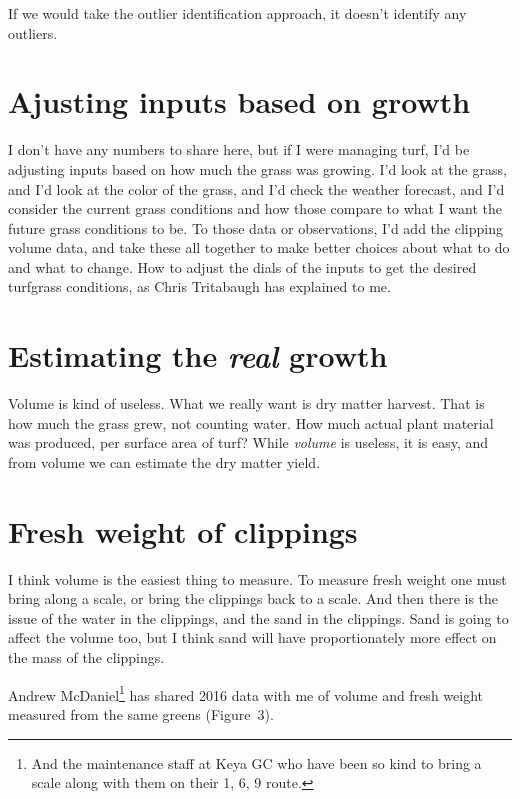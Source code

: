 \documentclass[12pt,b5,]{tufte-book}
\begin{document}
If we would take the outlier identification approach, it doesn't
identify any outliers.

\hypertarget{ajusting-inputs-based-on-growth}{%
\section{Ajusting inputs based on growth}\label{ajusting-inputs-based-on-growth}}

I don't have any numbers to share here, but if I were managing turf, I'd
be adjusting inputs based on how much the grass was growing. I'd look at
the grass, and I'd look at the color of the grass, and I'd check the
weather forecast, and I'd consider the current grass conditions and how
those compare to what I want the future grass conditions to be. To those
data or observations, I'd add the clipping volume data, and take these
all together to make better choices about what to do and what to change.
How to adjust the dials of the inputs to get the desired turfgrass
conditions, as Chris Tritabaugh has explained to me.

\hypertarget{estimating-the-real-growth}{%
\section{\texorpdfstring{Estimating the \emph{real} growth}{Estimating the real growth}}\label{estimating-the-real-growth}}

Volume is kind of useless. What we really want is dry matter harvest.
That is how much the grass grew, not counting water. How much actual
plant material was produced, per surface area of turf? While \emph{volume} is
useless, it is easy, and from volume we can estimate the dry matter
yield.

\hypertarget{fresh-weight-of-clippings}{%
\section{Fresh weight of clippings}\label{fresh-weight-of-clippings}}

I think volume is the easiest thing to measure. To measure fresh weight
one must bring along a scale, or bring the clippings back to a scale.
And then there is the issue of the water in the clippings, and the sand
in the clippings. Sand is going to affect the volume too, but I think
sand will have proportionately more effect on the mass of the clippings.

Andrew McDaniel\footnote{And the maintenance staff at Keya GC who have been so kind to
  bring a scale along with them on their 1, 6, 9 route.} has shared 2016 data with me of volume and fresh
weight measured from the same greens (Figure~3).
\end{document}
